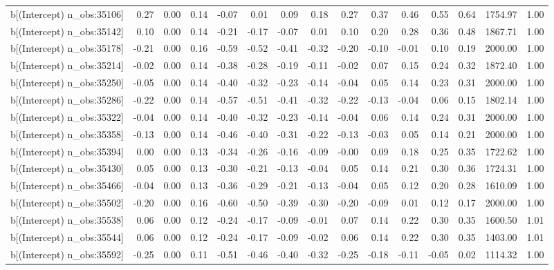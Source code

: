 \begin{table}[ht]
\begin{tabular}{rrrrrrrrrrrrrrr}
  b[(Intercept) n\_obs:35106] & 0.27 & 0.00 & 0.14 & -0.07 & 0.01 & 0.09 & 0.18 & 0.27 & 0.37 & 0.46 & 0.55 & 0.64 & 1754.97 & 1.00 \\ 
  b[(Intercept) n\_obs:35142] & 0.10 & 0.00 & 0.14 & -0.21 & -0.17 & -0.07 & 0.01 & 0.10 & 0.20 & 0.28 & 0.36 & 0.48 & 1867.71 & 1.00 \\ 
  b[(Intercept) n\_obs:35178] & -0.21 & 0.00 & 0.16 & -0.59 & -0.52 & -0.41 & -0.32 & -0.20 & -0.10 & -0.01 & 0.10 & 0.19 & 2000.00 & 1.00 \\ 
  b[(Intercept) n\_obs:35214] & -0.02 & 0.00 & 0.14 & -0.38 & -0.28 & -0.19 & -0.11 & -0.02 & 0.07 & 0.15 & 0.24 & 0.32 & 1872.40 & 1.00 \\ 
  b[(Intercept) n\_obs:35250] & -0.05 & 0.00 & 0.14 & -0.40 & -0.32 & -0.23 & -0.14 & -0.04 & 0.05 & 0.14 & 0.23 & 0.31 & 2000.00 & 1.00 \\ 
  b[(Intercept) n\_obs:35286] & -0.22 & 0.00 & 0.14 & -0.57 & -0.51 & -0.41 & -0.32 & -0.22 & -0.13 & -0.04 & 0.06 & 0.15 & 1802.14 & 1.00 \\ 
  b[(Intercept) n\_obs:35322] & -0.04 & 0.00 & 0.14 & -0.40 & -0.32 & -0.23 & -0.14 & -0.04 & 0.06 & 0.14 & 0.24 & 0.31 & 2000.00 & 1.00 \\ 
  b[(Intercept) n\_obs:35358] & -0.13 & 0.00 & 0.14 & -0.46 & -0.40 & -0.31 & -0.22 & -0.13 & -0.03 & 0.05 & 0.14 & 0.21 & 2000.00 & 1.00 \\ 
  b[(Intercept) n\_obs:35394] & 0.00 & 0.00 & 0.13 & -0.34 & -0.26 & -0.16 & -0.09 & -0.00 & 0.09 & 0.18 & 0.25 & 0.35 & 1722.62 & 1.00 \\ 
  b[(Intercept) n\_obs:35430] & 0.05 & 0.00 & 0.13 & -0.30 & -0.21 & -0.13 & -0.04 & 0.05 & 0.14 & 0.21 & 0.30 & 0.36 & 1724.31 & 1.00 \\ 
  b[(Intercept) n\_obs:35466] & -0.04 & 0.00 & 0.13 & -0.36 & -0.29 & -0.21 & -0.13 & -0.04 & 0.05 & 0.12 & 0.20 & 0.28 & 1610.09 & 1.00 \\ 
  b[(Intercept) n\_obs:35502] & -0.20 & 0.00 & 0.16 & -0.60 & -0.50 & -0.39 & -0.30 & -0.20 & -0.09 & 0.01 & 0.12 & 0.17 & 2000.00 & 1.00 \\ 
  b[(Intercept) n\_obs:35538] & 0.06 & 0.00 & 0.12 & -0.24 & -0.17 & -0.09 & -0.01 & 0.07 & 0.14 & 0.22 & 0.30 & 0.35 & 1600.50 & 1.01 \\ 
  b[(Intercept) n\_obs:35544] & 0.06 & 0.00 & 0.12 & -0.24 & -0.17 & -0.09 & -0.02 & 0.06 & 0.14 & 0.22 & 0.30 & 0.35 & 1403.00 & 1.01 \\ 
  b[(Intercept) n\_obs:35592] & -0.25 & 0.00 & 0.11 & -0.51 & -0.46 & -0.40 & -0.32 & -0.25 & -0.18 & -0.11 & -0.05 & 0.02 & 1114.32 & 1.00 \\ 

\end{tabular}
\end{table}
